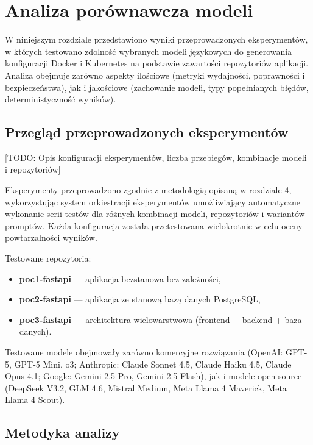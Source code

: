 \clearpage %
\section{Analiza porównawcza modeli}

W niniejszym rozdziale przedstawiono wyniki przeprowadzonych eksperymentów, w których testowano zdolność wybranych modeli językowych do generowania konfiguracji Docker i Kubernetes na podstawie zawartości repozytoriów aplikacji. Analiza obejmuje zarówno aspekty ilościowe (metryki wydajności, poprawności i bezpieczeństwa), jak i jakościowe (zachowanie modeli, typy popełnianych błędów, deterministyczność wyników).

\subsection{Przegląd przeprowadzonych eksperymentów}

[TODO: Opis konfiguracji eksperymentów, liczba przebiegów, kombinacje modeli i repozytoriów]

Eksperymenty przeprowadzono zgodnie z metodologią opisaną w rozdziale 4, wykorzystując system orkiestracji eksperymentów umożliwiający automatyczne wykonanie serii testów dla różnych kombinacji modeli, repozytoriów i wariantów promptów. Każda konfiguracja została przetestowana wielokrotnie w celu oceny powtarzalności wyników.

Testowane repozytoria:
\begin{itemize}
    \item \textbf{poc1-fastapi} — aplikacja bezstanowa bez zależności,
    \item \textbf{poc2-fastapi} — aplikacja ze stanową bazą danych PostgreSQL,
    \item \textbf{poc3-fastapi} — architektura wielowarstwowa (frontend + backend + baza danych).
\end{itemize}

Testowane modele obejmowały zarówno komercyjne rozwiązania (OpenAI: GPT-5, GPT-5 Mini, o3; Anthropic: Claude Sonnet 4.5, Claude Haiku 4.5, Claude Opus 4.1; Google: Gemini 2.5 Pro, Gemini 2.5 Flash), jak i modele open-source (DeepSeek V3.2, GLM 4.6, Mistral Medium, Meta Llama 4 Maverick, Meta Llama 4 Scout).

\subsection{Metodyka analizy}

